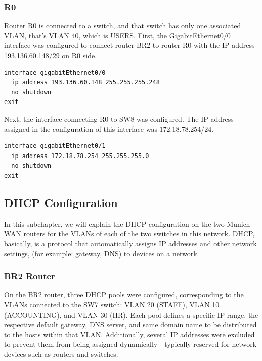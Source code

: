 \subsubsection*{R0}

Router R0 is connected to a switch, and that switch has only one associated VLAN, that's VLAN 40, which is USERS. 
First, the GigabitEthernet0/0 interface was configured to connect router BR2 to router R0 with the IP address 193.136.60.148/29 on R0 side.

\begin{lstlisting}[caption={Interface GigabitEthernet0/0 configuration on R0}, label={lst:r0-br2connection}]
interface gigabitEthernet0/0
  ip address 193.136.60.148 255.255.255.248
  no shutdown
exit
\end{lstlisting}

Next, the interface connecting R0 to SW8 was configured. The IP address assigned in the configuration of this interface was 172.18.78.254/24.
\begin{lstlisting}[caption={Configuring the GigabitEthernet0/1 interface on R0}, label={lst:r0-if_gb0/0}]
interface gigabitEthernet0/1
  ip address 172.18.78.254 255.255.255.0
  no shutdown
exit
\end{lstlisting}



\subsection{DHCP Configuration}
In this subchapter, we will explain the DHCP configuration on the two Munich WAN routers for the VLANs of each of the two switches in this network.
DHCP, basically, is a protocol that automatically assigns IP addresses and other network settings, (for example: gateway, DNS) to devices on a network.

\vspace{0.1cm}
\subsubsection*{BR2 Router}
On the BR2 router, three DHCP pools were configured, corresponding to the VLANs connected to the SW7 switch: VLAN 20 (STAFF), VLAN 10 (ACCOUNTING), and VLAN 30 (HR).  
Each pool defines a specific IP range, the respective default gateway, DNS server, and same domain name to be distributed to the hosts within that VLAN. Additionally, several IP addresses were excluded to prevent them from being assigned dynamically—typically reserved for network devices such as routers and switches.

